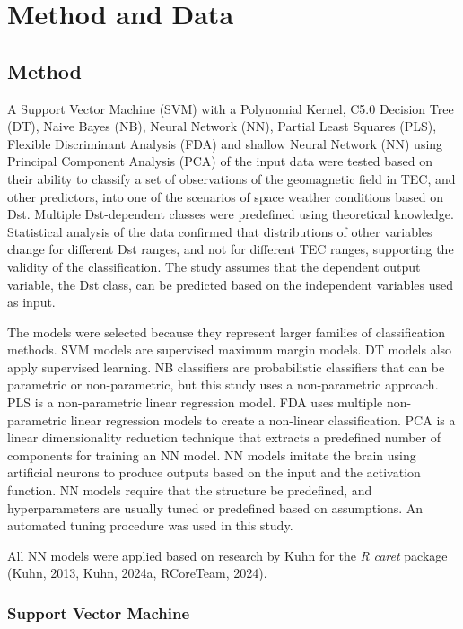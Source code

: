 \documentclass[sn-mathphys-num]{sn-jnl}%
\begin{document}
\section{Method and Data}
\label{sec:Dataset}

\subsection{Method}

A Support Vector Machine (SVM) with a Polynomial Kernel, C5.0 Decision Tree (DT), Naive Bayes (NB), Neural Network (NN), Partial Least Squares (PLS), Flexible Discriminant Analysis (FDA) and shallow Neural Network (NN) using Principal Component Analysis (PCA) of the input data were tested based on their ability to classify a set of observations of the geomagnetic field in TEC, and other predictors, into one of the scenarios of space weather conditions based on Dst. Multiple Dst-dependent classes were predefined using theoretical knowledge. Statistical analysis of the data confirmed that distributions of other variables change for different Dst ranges, and not for different TEC ranges, supporting the validity of the classification. The study assumes that the dependent output variable, the Dst class, can be predicted based on the independent variables used as input.

The models were selected because they represent larger families of classification methods. SVM models are supervised maximum margin models. DT models also apply supervised learning. NB classifiers are probabilistic classifiers that can be parametric or non-parametric, but this study uses a non-parametric approach. PLS is a non-parametric linear regression model. FDA uses multiple non-parametric linear regression models to create a non-linear classification. PCA is a linear dimensionality reduction technique that extracts a predefined number of components for training an NN model. NN models imitate the brain using artificial neurons to produce outputs based on the input and the activation function. NN models require that the structure be predefined, and hyperparameters are usually tuned or predefined based on assumptions. An automated tuning procedure was used in this study.

All NN models were applied based on research by Kuhn for the \textit{R} \textit{caret} package (Kuhn, 2013, Kuhn, 2024a, RCoreTeam, 2024).

\subsubsection{Support Vector Machine}
\end{document}
